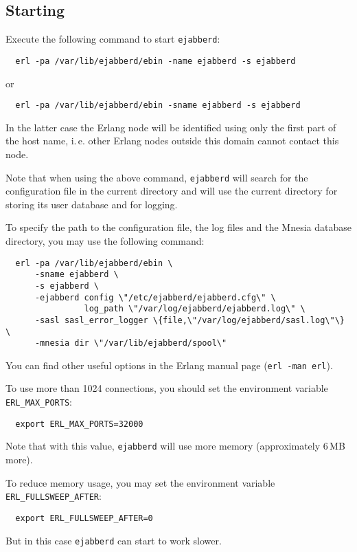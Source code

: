 \documentclass[a4paper,10pt]{article}
\newcommand{\ind}[1]{\begin{latexonly}\index{#1}\end{latexonly}}
\newcommand{\shell}[1]{\texttt{#1}}
\newcommand{\ejabberd}{\texttt{ejabberd}}
\begin{document}

\subsection{Starting}
\label{start}
\ind{starting}

Execute the following command to start \ejabberd{}:
\begin{verbatim}
  erl -pa /var/lib/ejabberd/ebin -name ejabberd -s ejabberd
\end{verbatim}
or
\begin{verbatim}
  erl -pa /var/lib/ejabberd/ebin -sname ejabberd -s ejabberd
\end{verbatim}
In the latter case the Erlang node will be identified using only the first part
of the host name, i.\,e. other Erlang nodes outside this domain cannot contact
this node.

Note that when using the above command, \ejabberd{} will search for the
configuration file in the current directory and will use the current directory
for storing its user database and for logging.

To specify the path to the configuration file, the log files and the Mnesia
database directory, you may use the following command:
\begin{verbatim}
  erl -pa /var/lib/ejabberd/ebin \
      -sname ejabberd \
      -s ejabberd \
      -ejabberd config \"/etc/ejabberd/ejabberd.cfg\" \
                log_path \"/var/log/ejabberd/ejabberd.log\" \
      -sasl sasl_error_logger \{file,\"/var/log/ejabberd/sasl.log\"\} \
      -mnesia dir \"/var/lib/ejabberd/spool\"
\end{verbatim}

You can find other useful options in the Erlang manual page
(\shell{erl -man erl}).

To use more than 1024 connections, you should set the environment variable
\verb|ERL_MAX_PORTS|:
\begin{verbatim}
  export ERL_MAX_PORTS=32000
\end{verbatim}
Note that with this value, \ejabberd{} will use more memory (approximately 6\,MB
more).

To reduce memory usage, you may set the environment variable
\verb|ERL_FULLSWEEP_AFTER|:
\begin{verbatim}
  export ERL_FULLSWEEP_AFTER=0
\end{verbatim}
But in this case \ejabberd{} can start to work slower.
\end{document}
